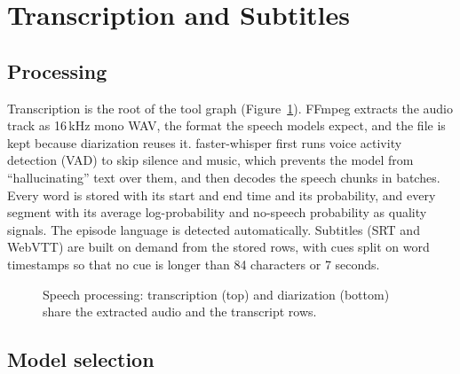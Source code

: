 \section{Transcription and Subtitles}
\label{s:asr}

\subsection*{Processing}

Transcription is the root of the tool graph (Figure~\ref{fig:speech}). FFmpeg extracts the audio track as 16\,kHz mono WAV, the format the speech models expect, and the file is kept because diarization reuses it. faster-whisper first runs voice activity detection (VAD) to skip silence and music, which prevents the model from ``hallucinating'' text over them, and then decodes the speech chunks in batches. Every word is stored with its start and end time and its probability, and every segment with its average log-probability and no-speech probability as quality signals. The episode language is detected automatically. Subtitles (SRT and WebVTT) are built on demand from the stored rows, with cues split on word timestamps so that no cue is longer than 84 characters or 7 seconds.

\begin{figure}[H]
\centering
{}
\caption{Speech processing: transcription (top) and diarization (bottom) share the extracted audio and the transcript rows.}
\label{fig:speech}
\end{figure}

\subsection*{Model selection}

